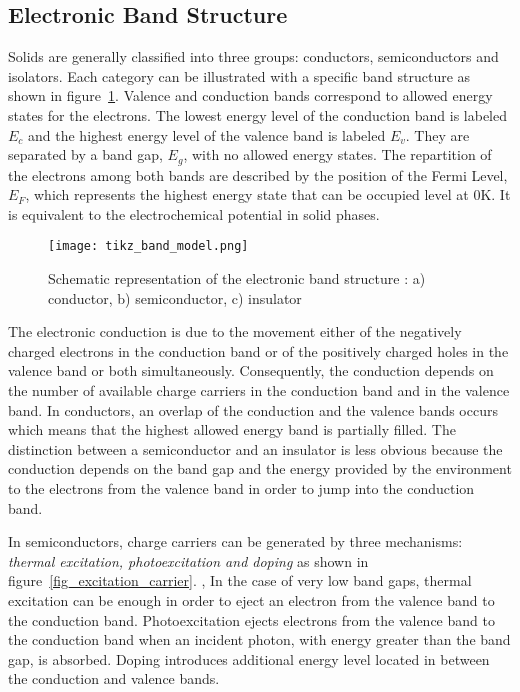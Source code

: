 \subsection{Electronic Band Structure}
    Solids are generally classified into three groups: 
    conductors, semiconductors and isolators. 
    Each category can be illustrated with a specific band structure as shown in 
    figure~\ref{fig_band_model}. 
    Valence and conduction bands correspond to allowed energy states for the electrons. 
    The lowest energy level of the conduction band is labeled $E_c$ and the 
    highest energy level of the valence band is labeled $E_v$. 
    They are separated by a band gap, $E_g$, with no allowed energy states. 
    The repartition of the electrons among both bands are described by the position 
    of the Fermi Level, $E_F$, which represents the highest energy state that 
    can be occupied level at 0K. 
    It is equivalent to the electrochemical potential in solid phases.

    \begin{figure}[h]
        \centering
            \texttt{[image: tikz\_band\_model.png]}
        \caption{Schematic representation of the electronic band structure \citep{marucco2006}: 
        a) conductor, b) semiconductor, c) insulator}
        \label{fig_band_model}
    \end{figure}

    The electronic conduction is due to the movement either of the negatively 
    charged electrons in the conduction band or of the positively charged holes 
    in the valence band or both simultaneously. 
    Consequently, the conduction depends on the number of available charge carriers
    in the conduction band and in the valence band. 
    In conductors, an overlap of the conduction and the valence bands occurs 
    which means that the highest allowed energy band is partially filled. 
    The distinction between a semiconductor and an insulator is less obvious 
    because the conduction depends on the band gap and the energy provided by 
    the environment to the electrons from the valence band in order to jump 
    into the conduction band.

    In semiconductors, charge carriers can be generated by three mechanisms: 
    \emph{thermal excitation, photoexcitation and doping} as shown in 
    figure~\ref{fig_excitation_carrier}.  , 
    In the case of very low band gaps, thermal excitation can be enough in order 
    to eject an electron from the valence band to the conduction band. 
    Photoexcitation ejects electrons from the valence band to the conduction 
    band when an incident photon, with energy greater than the band gap, is absorbed. 
    Doping introduces additional energy level located in between the conduction and 
    valence bands.

